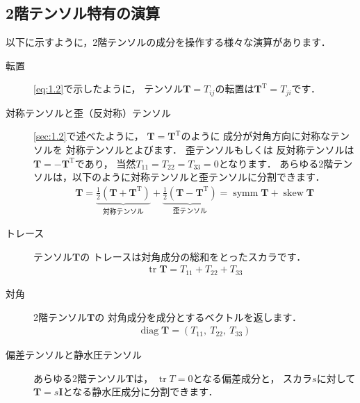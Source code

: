 \subsection{2階テンソル特有の演算}
\label{ssec:1.3.9}
以下に示すように，2階テンソルの成分を操作する様々な演算があります．
\begin{description}
 \item[転置]
%
            \autoref{eq:1.2}で示したように，
            テンソル$\bm{T} = T_{ij}$の転置は$\bm{T}^{\mathrm{T}} = T_{ji}$です．
 \item[対称テンソルと歪（反対称）テンソル] \autoref{sec:1.2}で述べたように，
            $\bm{T} = \bm{T}^{\mathrm{T}}$のように
            成分が対角方向に対称なテンソルを
%
            対称テンソルとよびます．
%
            歪テンソルもしくは
%
            反対称テンソルは$\bm{T} = -\bm{T}^{\mathrm{T}}$であり，
            当然$T_{11} = T_{22} = T_{33} = 0$となります．
            あらゆる2階テンソルは，以下のように対称テンソルと歪テンソルに分割できます．
            \begin{align}
             \label{eq:1.31}
             \bm{T} = \underbrace{\frac{1}{2}(\bm{T} + \bm{T}^{\mathrm{T}})}_{\text{対称テンソル}}
             + \underbrace{\frac{1}{2}(\bm{T} - \bm{T}^{\mathrm{T}})}_{\text{歪テンソル}}
             = \mathop{\mathrm{symm}}\bm{T} + \mathop{\mathrm{skew}}\bm{T}
            \end{align}
 \item[トレース] テンソル$\bm{T}$の
%
            トレースは対角成分の総和をとったスカラです．
            \begin{align}
             \label{eq:1.32}
             \mathop{\mathrm{tr}}\bm{T} = T_{11} + T_{22} + T_{33}
            \end{align}
 \item[対角] 2階テンソル$\bm{T}$の
%
            対角成分を成分とするベクトルを返します．
            \begin{align}
             \label{eq:1.33}
             \mathop{\mathrm{diag}}\bm{T} = (T_{11},\ T_{22},\ T_{33})
            \end{align}
 \item[偏差テンソルと静水圧テンソル] あらゆる2階テンソル$\bm{T}$は，
            $\mathop{\mathrm{tr}}T = 0$となる偏差成分と，
            スカラ$s$に対して$\bm{T} = s\bm{I}$となる静水圧成分に分割できます．

\end{description}
